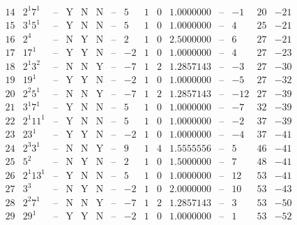 \documentclass[11pt,reqno,a4letter]{article}
\numberwithin{figure}{section}
\numberwithin{table}{section}
\theoremstyle{plain}
\numberwithin{theorem}{section}
\theoremstyle{definition}
\begin{document}
\begin{table}[h!]
\begin{equation*}
{\begin{array}{|cc|c|ccc|c|c|ccc|c|ccc}
 14 & 2^1 7^1 & \text{--} & \text{Y} & \text{N} & \text{N} & \text{--} & 5 & 1 & 0 & 1.0000000 & \text{--} & -1 & 20 & -21 \\
 15 & 3^1 5^1 & \text{--} & \text{Y} & \text{N} & \text{N} & \text{--} & 5 & 1 & 0 & 1.0000000 & \text{--} & 4 & 25 & -21 \\
 16 & 2^4 & \text{--} & \text{N} & \text{Y} & \text{N} & \text{--} & 2 & 1 & 0 & 2.5000000 & \text{--} & 6 & 27 & -21 \\
 17 & 17^1 & \text{--} & \text{Y} & \text{Y} & \text{N} & \text{--} & -2 & 1 & 0 & 1.0000000 & \text{--} & 4 & 27 & -23 \\
 18 & 2^1 3^2 & \text{--} & \text{N} & \text{N} & \text{Y} & \text{--} & -7 & 1 & 2 & 1.2857143 & \text{--} & -3 & 27 & -30 \\
 19 & 19^1 & \text{--} & \text{Y} & \text{Y} & \text{N} & \text{--} & -2 & 1 & 0 & 1.0000000 & \text{--} & -5 & 27 & -32 \\
 20 & 2^2 5^1 & \text{--} & \text{N} & \text{N} & \text{Y} & \text{--} & -7 & 1 & 2 & 1.2857143 & \text{--} & -12 & 27 & -39 \\
 21 & 3^1 7^1 & \text{--} & \text{Y} & \text{N} & \text{N} & \text{--} & 5 & 1 & 0 & 1.0000000 & \text{--} & -7 & 32 & -39 \\
 22 & 2^1 11^1 & \text{--} & \text{Y} & \text{N} & \text{N} & \text{--} & 5 & 1 & 0 & 1.0000000 & \text{--} & -2 & 37 & -39 \\
 23 & 23^1 & \text{--} & \text{Y} & \text{Y} & \text{N} & \text{--} & -2 & 1 & 0 & 1.0000000 & \text{--} & -4 & 37 & -41 \\
 24 & 2^3 3^1 & \text{--} & \text{N} & \text{N} & \text{Y} & \text{--} & 9 & 1 & 4 & 1.5555556 & \text{--} & 5 & 46 & -41 \\
 25 & 5^2 & \text{--} & \text{N} & \text{Y} & \text{N} & \text{--} & 2 & 1 & 0 & 1.5000000 & \text{--} & 7 & 48 & -41 \\
 26 & 2^1 13^1 & \text{--} & \text{Y} & \text{N} & \text{N} & \text{--} & 5 & 1 & 0 & 1.0000000 & \text{--} & 12 & 53 & -41 \\
 27 & 3^3 & \text{--} & \text{N} & \text{Y} & \text{N} & \text{--} & -2 & 1 & 0 & 2.0000000 & \text{--} & 10 & 53 & -43 \\
 28 & 2^2 7^1 & \text{--} & \text{N} & \text{N} & \text{Y} & \text{--} & -7 & 1 & 2 & 1.2857143 & \text{--} & 3 & 53 & -50 \\
 29 & 29^1 & \text{--} & \text{Y} & \text{Y} & \text{N} & \text{--} & -2 & 1 & 0 & 1.0000000 & \text{--} & 1 & 53 & -52 \\

\end{array}}
\end{equation*}
\end{table}
\end{document}

